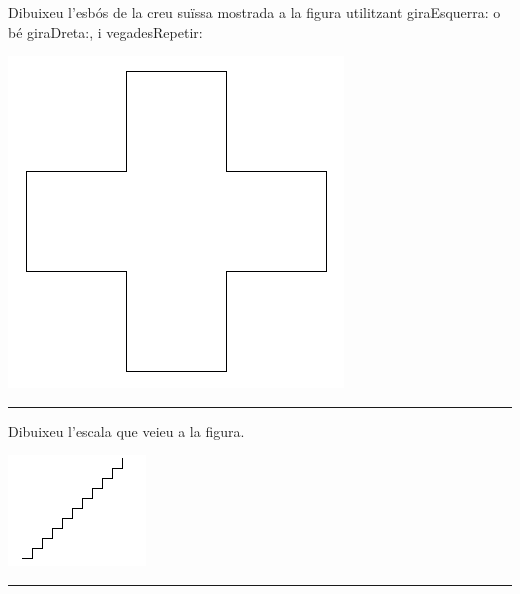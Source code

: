 \begin{center}
\colorbox{black}{}
\end{center}
{\small
\noindent
Dibuixeu l'esbós de la creu suïssa mostrada a la figura utilitzant \textsf{giraEsquerra:} o bé \textsf{giraDreta:}, i \textsf{vegadesRepetir:}}
\begin{center}
\includegraphics[scale=0.26]{Imatges/figuraE7-6.png} 
\end{center}
\noindent
\rule{\textwidth}{3pt}

\begin{center}
\colorbox{black}{}
\end{center}
{\small
\noindent
Dibuixeu l'escala que veieu a la figura.}
\begin{center}
\includegraphics[scale=0.72]{Imatges/figuraE7-7.png} 
\end{center}
\noindent
\rule{\textwidth}{3pt}

